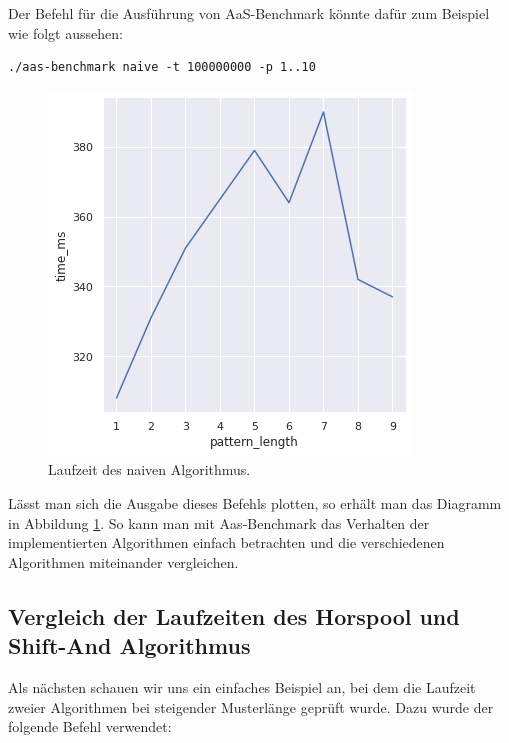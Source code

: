 \documentclass[twocolumn]{article}
\begin{document}
Der Befehl für die Ausführung von AaS-Benchmark könnte dafür zum Beispiel wie folgt aussehen:

\begin{lstlisting}[breaklines=true,autogobble=true]
    ./aas-benchmark naive -t 100000000 -p 1..10
\end{lstlisting}

\begin{figure}
    \includegraphics[width=\linewidth]{assets/graph_1.png}
    \caption{Laufzeit des naiven Algorithmus.}
    \label{fig:runtime_naive}
\end{figure}

Lässt man sich die Ausgabe dieses Befehls plotten, so erhält man das Diagramm in Abbildung \ref{fig:runtime_naive}. So kann man mit Aas-Benchmark das Verhalten der implementierten Algorithmen einfach betrachten und die verschiedenen Algorithmen miteinander vergleichen.

\subsection*{Vergleich der Laufzeiten des Horspool und Shift-And Algorithmus}

Als nächsten schauen wir uns ein einfaches Beispiel an, bei dem die Laufzeit zweier Algorithmen bei steigender Musterlänge geprüft wurde. Dazu wurde der folgende Befehl verwendet:
\end{document}
